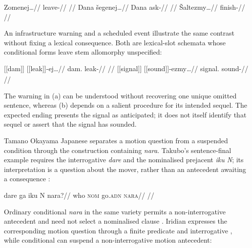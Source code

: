 \pex \label{ex:cond-insub}
\a
\begingl
\gla Zomenej\ldots//
\glb leave-\Cond{}//
\glft {} //
\endgl
\a
\begingl
\gla Dana šegenej\ldots//
\glb Dana ask-\Cond{}//
\glft {} //
\endgl
\a
\begingl
\gla Šaltezmy\ldots//
\glb finish-\ECond{}//
\glft {} //
\endgl
\xe

An infrastructure warning and a scheduled event illustrate the same
contrast without fixing a lexical consequence. Both are lexical-slot
schemata whose conditional forms leave stem allomorphy unspecified:

\pex\label{ex:conditional-slot-standalone}
\a
\begingl
\gla \textnormal{[[dam]]}\textsubscript{\Dir{}} [[leak]]-ej\ldots//
\glb dam.\Dir{} leak-\Cond{}//
\glft {}
//
\endgl
\a
\begingl
\gla \textnormal{[[signal]]}\textsubscript{\Dir{}} [[sound]]-ezmy\ldots//
\glb signal.\Dir{} sound-\ECond{}//
\glft {}
//
\endgl
\xe

The warning in (a) can be understood without recovering one unique omitted
sentence, whereas (b) depends on a salient procedure for its intended sequel.
The expected ending presents the signal as anticipated; it does not itself
identify that sequel or assert that the signal has sounded.

Tamano Okayama Japanese separates a motion question from a suspended
condition through the construction containing \textit{nara}. Takubo's
sentence-final example requires the interrogative \textit{dare} and the
nominalised prejacent \textit{iku N}; its interpretation is a question
about the mover, rather than an antecedent awaiting a consequence
\cite[p.~68, (28)]{takubo2025conditionals}:

\ex\label{ex:japanese-final-nara}%
\begingl
\gla dare ga iku N nara?//
\glb who \textsc{nom} go.\textsc{adn} \Compl{} \textsc{nara}//
\glft {}
//
\endgl
\xe

Ordinary conditional \textit{nara} in the same variety permits a
non-interrogative antecedent and need not select a nominalised clause
\cite[pp.~67--68, §§2.1--2.2]{takubo2025conditionals}.
Iridian expresses the corresponding motion question through a finite
predicate and interrogative , while conditional 
can suspend a non-interrogative motion antecedent:

